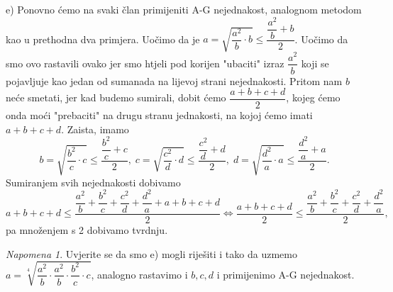 \documentclass{book}
\renewenvironment{proof}{%
    \vspace{-\parskip}\begin{oldproof}%
    }{%
    \end{oldproof}%
}
\theoremstyle{definition}
\theoremstyle{definition}
\theoremstyle{remark}
\newtheorem{remark}{Napomena}
\begin{document}
\begin{proof}[Rješenje]
e) Ponovno ćemo na svaki član primijeniti A-G nejednakost, analognom metodom kao u prethodna dva primjera. Uočimo da je
$a=\sqrt{\dfrac{a^2}{b}\cdot b}\leq \dfrac{\dfrac{a^2}{b}+b}{2}$. Uočimo da smo ovo rastavili ovako jer smo htjeli pod korijen "ubaciti" izraz $\dfrac{a^2}{b}$ koji se pojavljuje kao jedan od sumanada na lijevoj strani nejednakosti. Pritom nam $b$ neće smetati, jer kad budemo sumirali, dobit ćemo $\dfrac{a+b+c+d}{2}$, kojeg ćemo onda moći "prebaciti" na drugu stranu jednakosti, na kojoj ćemo imati $a+b+c+d$. Zaista, imamo $$b=\sqrt{\dfrac{b^2}{c}\cdot c}\leq \dfrac{\dfrac{b^2}{c}+c}{2},\;c=\sqrt{\dfrac{c^2}{d}\cdot d}\leq \dfrac{\dfrac{c^2}{d}+d}{2},\;d=\sqrt{\dfrac{d^2}{a}\cdot a}\leq \dfrac{\dfrac{d^2}{a}+a}{2}. $$Sumiranjem svih nejednakosti dobivamo
$$a+b+c+d\leq\dfrac{\dfrac{a^2}{b}+\dfrac{b^2}{c}+\dfrac{c^2}{d}+\dfrac{d^2}{a}+a+b+c+d}{2}\Leftrightarrow \dfrac{a+b+c+d}{2}\leq \dfrac{\dfrac{a^2}{b}+\dfrac{b^2}{c}+\dfrac{c^2}{d}+\dfrac{d^2}{a}}{2},$$
pa množenjem s 2 dobivamo tvrdnju.
\end{proof}
\begin{remark}
Uvjerite se da smo e) mogli riješiti i tako da uzmemo $a=\sqrt[4]{\dfrac{a^2}{b}\cdot \dfrac{a^2}{b}\cdot \dfrac{b^2}{c}\cdot c}$, analogno rastavimo i $b, c, d$ i primijenimo A-G nejednakost.
\end{remark}
\end{document}
